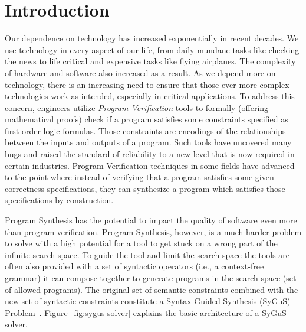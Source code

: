 \section{Introduction}
\label{sec:introduction}
Our dependence on technology has increased exponentially in recent decades.
%
We use technology in every aspect of our life, from daily mundane tasks like checking the news to life critical and expensive tasks like flying airplanes.
%
The complexity of hardware and software also increased as a result.
%
As we depend more on technology, there is an increasing need to ensure that those ever more complex technologies work as intended, especially in critical applications.
%
To address this concern, engineers utilize \emph{Program Verification} tools
%
to formally (offering mathematical proofs) check if a program satisfies some constraints specified as first-order logic formulas.
%
Those constraints are encodings of the relationships between the inputs and outputs of a program.
%
Such tools have uncovered many bugs and raised the standard of reliability to a new level that is now required in certain industries.
%
Program Verification techniques in some fields have advanced to the point where instead of verifying that a program satisfies some given correctness specifications,
%
they can synthesize a program which satisfies those specifications by construction.

Program Synthesis has the potential to impact the quality of software even more than program verification.
Program Synthesis, however, is a much harder problem to solve with a high potential for a tool to get stuck on a wrong part of the infinite search space.
%
To guide the tool and limit the search space the tools are often also provided with a set of syntactic operators (i.e., a context-free grammar) it can compose together to generate programs in the search space (set of allowed programs).
%
The original set of semantic constraints combined with the new set of syntactic constraints constitute a Syntax-Guided Synthesis (SyGuS) Problem~\cite{sygus:2013}. Figure~\ref{fig:sygus-solver} explains the basic architecture of a SyGuS solver.


